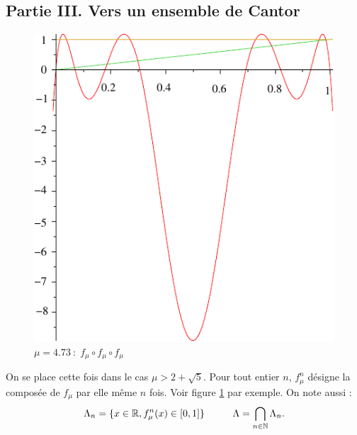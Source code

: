 \subsection*{Partie III. Vers un ensemble de Cantor}
\begin{figure}[ht]
\begin{center}
	\includegraphics{Elogistic_5.pdf}
\end{center}
\caption{$\mu=4.73 \: :\; f_\mu \circ f_\mu \circ f_\mu$}
\label{fig:Elogistic_5}
\end{figure}
On se place cette fois dans le cas $\mu>2+\sqrt{5}$. Pour tout entier $n$, $f_\mu ^n$ désigne la composée de $f_\mu $ par elle même $n$ fois. Voir figure \ref{fig:Elogistic_5} par exemple. On note aussi :
\begin{displaymath}
\Lambda_n = \{x\in\mathbb{R} , f_\mu ^n(x)\in [0,1]\} \hspace{1cm}
\Lambda = \bigcap_{n\in \mathbb{N}} \Lambda _n .
\end{displaymath}

